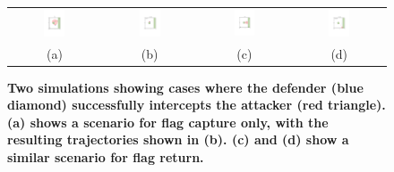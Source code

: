 \documentclass[letterpaper, 10 pt, conference]{ieeeconf}  %
\numberwithin{algorithm}{section}
\begin{document}
\setlength\tabcolsep{0.5pt}
\begin{figure}
	\centering
	\begin{tabular}{cccc}
		\includegraphics[width=0.25\textwidth]{figures/defenderWinFC/defenderWinFC1.pdf} &
		\includegraphics[width=0.25\textwidth]{figures/defenderWinFC/defenderWinFC7.pdf} &
		\includegraphics[width=0.25\textwidth]{figures/defenderWinFR/defenderWinFR1.pdf} &
		\includegraphics[width=0.25\textwidth]{figures/defenderWinFR/defenderWinFR4.pdf} \\
		(a) & (b) & (c) & (d)  \\
	\end{tabular} 
	\caption{\textbf{Two simulations showing cases where the defender (blue diamond) successfully intercepts the attacker (red triangle). (a) shows a scenario for flag capture only, with the resulting trajectories shown in (b). (c) and (d) show a similar scenario for flag return.}}
	\label{fig:defenderWin}
\end{figure} 
\setlength\tabcolsep{6pt}
\end{document}

